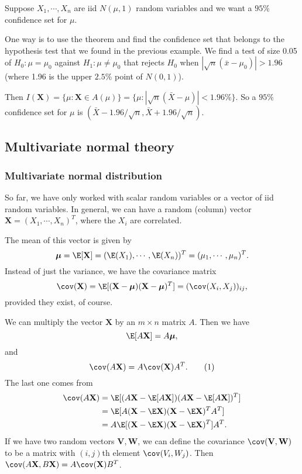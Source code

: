 \documentclass[a4paper]{article}
\begin{document}
\begin{eg}
  Suppose $X_1, \cdots, X_n$ are iid $N(\mu, 1)$ random variables and we want a $95\%$ confidence set for $\mu$.

  One way is to use the theorem and find the confidence set that belongs to the hypothesis test that we found in the previous example. We find a test of size 0.05 of $H_0 : \mu= \mu_0$ against $H_1: \mu\not= \mu_0$ that rejects $H_0$ when $|\sqrt{n}(\bar x - \mu_0)| > 1.96$ (where 1.96 is the upper $2.5\%$ point of $N(0, 1)$).

  Then $I(\mathbf{X}) = \{\mu: \mathbf{X}\in A(\mu)\} = \{\mu:|\sqrt{n}(\bar X - \mu)| < 1.96\%\}$. So a $95\%$ confidence set for $\mu$ is $(\bar X - 1.96/\sqrt{n}, \bar X + 1.96/\sqrt{n})$.
\end{eg}
\subsection{Multivariate normal theory}
\subsubsection{Multivariate normal distribution}
So far, we have only worked with scalar random variables or a vector of iid random variables. In general, we can have a random (column) vector $\mathbf{X} = (X_1, \cdots, X_n)^T$, where the $X_i$ are correlated.

The mean of this vector is given by
\[
  \boldsymbol\mu = \E[\mathbf{X}] = (\E(X_1), \cdots, \E(X_n))^T = (\mu_1, \cdots, \mu_n)^T.
\]
Instead of just the variance, we have the covariance matrix
\[
  \cov (\mathbf{X}) = \E[(\mathbf{X} - \boldsymbol\mu)(\mathbf{X} - \boldsymbol\mu)^T] = (\cov(X_i, X_j))_{ij},
\]
provided they exist, of course.

We can multiply the vector $\mathbf{X}$ by an $m\times n$ matrix $A$. Then we have
\[
  \E[A\mathbf{X}] = A\boldsymbol\mu,
\]
and
\[
  \cov (A\mathbf{X}) = A\cov(\mathbf{X})A^T.\tag{1}
\]
The last one comes from
\begin{align*}
  \cov(A\mathbf{X}) &= \E[(A\mathbf{X} -\E[A\mathbf{X}])(A\mathbf{X} - \E[A\mathbf{X}])^T] \\
  &= \E[A(\mathbf{X} - \E\mathbf{X})(\mathbf{X} - \E\mathbf{X})^T A^T]\\
  &= A\E[(\mathbf{X} - \E\mathbf{X})(\mathbf{X} - \E\mathbf{X})^T]A^T.
\end{align*}
If we have two random vectors $\mathbf{V}, \mathbf{W}$, we can define the covariance $\cov(\mathbf{V}, \mathbf{W})$ to be a matrix with $(i, j)$th element $\cov(V_i, W_j)$. Then $\cov(A\mathbf{X}, B\mathbf{X}) = A\cov (\mathbf{X}) B^T$.
\end{document}

